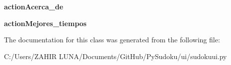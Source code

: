 \begin{DoxyCompactItemize}
\item 
\hypertarget{classsudokuui_1_1_ui___main_window_a2e0a25588fa107e4c61181ed80bb3a46}{{\bfseries action\-Acerca\-\_\-de}}\label{classsudokuui_1_1_ui___main_window_a2e0a25588fa107e4c61181ed80bb3a46}

\item 
\hypertarget{classsudokuui_1_1_ui___main_window_aece3a743957be27f6f09c6c882582958}{{\bfseries action\-Mejores\-\_\-tiempos}}\label{classsudokuui_1_1_ui___main_window_aece3a743957be27f6f09c6c882582958}

\end{DoxyCompactItemize}


The documentation for this class was generated from the following file\-:\begin{DoxyCompactItemize}
\item 
C\-:/\-Users/\-Z\-A\-H\-I\-R  L\-U\-N\-A/\-Documents/\-Git\-Hub/\-Py\-Sudoku/ui/sudokuui.\-py\end{DoxyCompactItemize}

